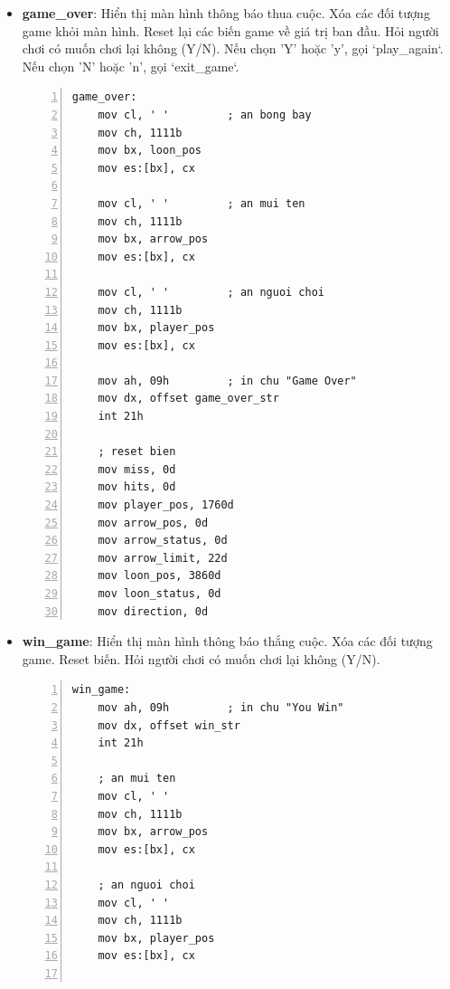 \documentclass[12pt,a4paper,openany,oneside]{report}
\begin{document}
\begin{itemize}
\begin{lstlisting}[caption={Mã nguồn nhãn hide_arrow}, basicstyle=\ttfamily\footnotesize, numbers=left, numberstyle=\tiny, stepnumber=1, numbersep=5pt, breaklines=true, language={[x86masm]Assembler}]
    cmp loon_pos, 0d 
    jle miss_loon
    jne render_loon 
    jmp inside_loop2
\end{lstlisting} 
    \item \textbf{game\_over}: Hiển thị màn hình thông báo thua cuộc. Xóa các đối tượng game khỏi màn hình. Reset lại các biến game về giá trị ban đầu. Hỏi người chơi có muốn chơi lại không (Y/N). Nếu chọn 'Y' hoặc 'y', gọi `play_again`. Nếu chọn 'N' hoặc 'n', gọi `exit_game`.
\begin{lstlisting}[caption={Mã nguồn nhãn game_over}, basicstyle=\ttfamily\footnotesize, numbers=left, numberstyle=\tiny, stepnumber=1, numbersep=5pt, breaklines=true, language={[x86masm]Assembler}]
game_over:     
    mov cl, ' '         ; an bong bay
    mov ch, 1111b 
    mov bx, loon_pos  
    mov es:[bx], cx  
    
    mov cl, ' '         ; an mui ten
    mov ch, 1111b 
    mov bx, arrow_pos                      
    mov es:[bx], cx
          
    mov cl, ' '         ; an nguoi choi
    mov ch, 1111b 
    mov bx, player_pos  
    mov es:[bx], cx    
    
    mov ah, 09h         ; in chu "Game Over"
    mov dx, offset game_over_str
    int 21h
    
    ; reset bien
    mov miss, 0d
    mov hits, 0d
    mov player_pos, 1760d
    mov arrow_pos, 0d
    mov arrow_status, 0d 
    mov arrow_limit, 22d
    mov loon_pos, 3860d
    mov loon_status, 0d
    mov direction, 0d
\end{lstlisting} 
    \item \textbf{win\_game}: Hiển thị màn hình thông báo thắng cuộc. Xóa các đối tượng game. Reset biến. Hỏi người chơi có muốn chơi lại không (Y/N).
\begin{lstlisting}[caption={Mã nguồn nhãn win_game}, basicstyle=\ttfamily\footnotesize, numbers=left, numberstyle=\tiny, stepnumber=1, numbersep=5pt, breaklines=true, language={[x86masm]Assembler}]
win_game:
    mov ah, 09h         ; in chu "You Win"
    mov dx, offset win_str
    int 21h

    ; an mui ten
    mov cl, ' '
    mov ch, 1111b
    mov bx, arrow_pos
    mov es:[bx], cx

    ; an nguoi choi
    mov cl, ' '
    mov ch, 1111b
    mov bx, player_pos
    mov es:[bx], cx


\end{lstlisting}
\end{itemize}
\end{document}
